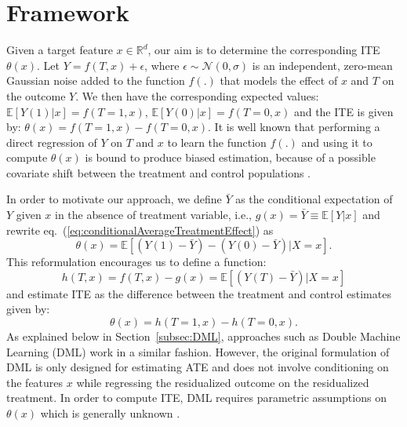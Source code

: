 \documentclass[sigconf]{acmart}
\newcommand{\eat}[1]{}
\theoremstyle{plain}
\numberwithin{equation}{section}
\begin{document}
\section{Framework}
\label{sec:method}
Given a target feature $x \in \mathbb{R}^d$, our aim is to determine the corresponding ITE $\theta(x)$. Let $Y = f(T,x) + \epsilon$, where $\epsilon \sim \mathcal{N}(0, \sigma)$ is an independent, zero-mean Gaussian noise added to the function $f(.)$ that models the effect of $x$ and $T$ on the outcome $Y$. We then have the corresponding expected values: $\mathbb{E}\left[Y(1) | x\right] = f(T=1, x)$, $\mathbb{E}\left[Y(0) | x\right] = f(T=0, x)$ and the ITE is given by: $\theta(x) = f(T=1, x) - f(T=0, x)$. It is well known that performing a direct regression of $Y$ on $T$ and $x$ to learn the function $f(.)$ and using it to compute $\theta(x)$ is bound to produce biased estimation, because of a possible covariate shift between the treatment and control populations \cite{learningRepresentations, covariateShiftScholkopf, covariateShiftMIT}. \eat{There are several approaches that first try to match units in different population segments and compute the conditional expectation over each matched segment~\cite{rubin1983}, \cite{Austin11}. However, most of the matching is based on projections (propensity or other distance metrics) and the assumptions behind these projections may not always hold true \cite{King16}.}

In order to motivate our approach, we define $\bar{Y}$ as the conditional expectation of $Y$ given $x$ in the absence of treatment variable, i.e., $g(x) = \bar{Y} \equiv \mathbb{E}\left[Y | x\right]$ and rewrite eq.~(\ref{eq:conditionalAverageTreatmentEffect}) as $$\theta(x) = \mathbb{E}\left[(Y(1) - \bar{Y}) - (Y(0) - \bar{Y})  | X=x\right].$$ This reformulation encourages us to define a function:
\begin{equation}
\label{eq:f}
h(T,x) = f(T,x) - g(x) = \mathbb{E}\left[(Y(T) - \bar{Y}) | X=x \right]
\end{equation}
and estimate ITE as the difference between the treatment and control estimates given by:
\begin{equation}
\label{eq:ITE}
\theta(x) = h(T=1,x) - h(T=0,x).
\end{equation}
\eat{We demonstrate below that such a reformulation can indeed produce an unbiased estimate for ITE. }As explained below in Section~\ref{subsec:DML}, approaches such as Double Machine Learning (DML) \cite{doubleML} work in a similar fashion. However, the original formulation of DML is only designed for estimating ATE and does not involve conditioning on the features $x$ while regressing the residualized outcome on the residualized treatment. In order to compute ITE, DML requires parametric assumptions on $\theta(x)$ which is generally unknown \cite{chernozhukovsemiparametric}.
\end{document}
